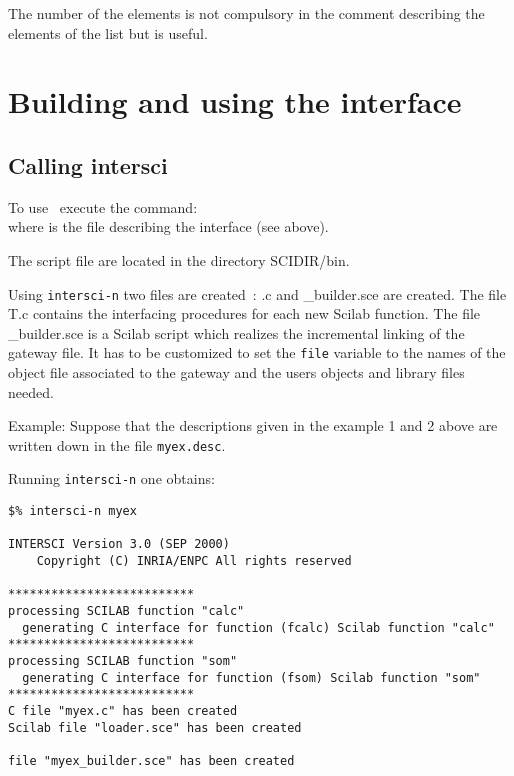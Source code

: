\documentclass[11pt]{article}
\begin{document}


The number of the elements is not compulsory in the comment describing the
elements of the list but is useful.


\section{Building and using the interface}

\subsection{Calling intersci}
To use \ISCI\ execute the command:\\
 \T{\ }
where  is the file describing the interface
(see above). 

The  script file are located in the
directory SCIDIR/bin.

Using {\tt intersci-n} two files are created~: .c and \_builder.sce are
created.  The file T.c contains the interfacing
procedures for each new Scilab function. The file
\_builder.sce is a Scilab script which realizes the
incremental linking of the gateway file. It has to be customized to
set the {\tt file} variable to the names of the object file associated
to the gateway and the users objects and library files needed.
\medskip

\noindent Example:
Suppose that the descriptions given in the example 1 and 2 above are
written down in the file {\tt myex.desc}.

\noindent Running {\tt intersci-n}  one obtains:

\begin{verbatim}
$% intersci-n myex
 
INTERSCI Version 3.0 (SEP 2000)
    Copyright (C) INRIA/ENPC All rights reserved
 
**************************
processing SCILAB function "calc"
  generating C interface for function (fcalc) Scilab function "calc"
**************************
processing SCILAB function "som"
  generating C interface for function (fsom) Scilab function "som" 
**************************
C file "myex.c" has been created
Scilab file "loader.sce" has been created
 
file "myex_builder.sce" has been created
\end{verbatim} %
\medskip
\end{document}
